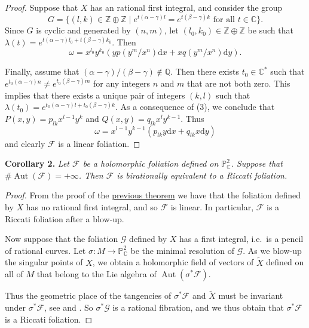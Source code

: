 \documentclass[british]{article}
\newenvironment{itenv}[1]
  {\phantomsection\par\smallskip\noindent\textbf{#1.}\itshape}
  {\par\smallskip}
\newcommand{\oldpage}[1]{\marginpar{\footnotesize$\Big\vert$ \textit{p.~#1}}}
\begin{document}
\begin{proof}
Suppose that \(X\) has an rational first integral, and consider the
group \[
  G
  = \{ (l,k)\in\mathbb{Z}\oplus\mathbb{Z}\mid e^{t(\alpha-\gamma)l}=e^{t(\beta-\gamma)k}\text{ for all }t\in\mathbb{C}\}.
\] Since \(G\) is cyclic and generated by \((n,m)\), let
\((l_0,k_0)\in\mathbb{Z}\oplus\mathbb{Z}\) be such that
\(\lambda(t)=e^{t(\alpha-\gamma)l_0+t(\beta-\gamma)k_0}\). Then \[
  \omega
  = x^{l_0}y^{k_0}(yp(y^m/x^n)\mathrm{d}{x} + xq(y^m/x^n)\mathrm{d}{y}).
\]

Finally, assume that
\((\alpha-\gamma)/(\beta-\gamma)\not\in\mathbb{Q}\). Then there exists
\(t_0\in\mathbb{C}^*\) such that
\(e^{t_0(\alpha-\gamma)n}\neq e^{t_0(\beta-\gamma)m}\) for any integers
\(n\) and \(m\) that are not both zero. This implies that there exists a
unique pair of integers \((k,l)\) such that
\(\lambda(t_0)=e^{t_0(\alpha-\gamma)l+t_0(\beta-\gamma)k}\). As a
consequence of (3), we conclude that \(P(x,y)=p_{lk}x^{l-1}y^k\) and
\(Q(x,y)=q_{lk}x^ly^{k-1}\). Thus \[
  \omega
  = x^{l-1}y^{k-1}(p_{lk}y\mathrm{d}{x} + q_{lk}x\mathrm{d}{y})
\] and clearly \({\mathcal{F}}\) is a linear foliation.
\end{proof}

\oldpage{55}

\protect{}\label{corollary-2}
\begin{itenv}{Corollary 2}
Let \({\mathcal{F}}\) be a holomorphic foliation defined on
\(\mathbb{P}_\mathbb{C}^2\). Suppose that
\(\#\operatorname{Aut}({\mathcal{F}})=+\infty\). Then \({\mathcal{F}}\)
is birationally equivalent to a Riccati foliation.

\end{itenv}

\begin{proof}
From the proof of the \hyperref[theorem-1]{previous theorem} we have
that the foliation defined by \(X\) has no rational first integral, and
so \({\mathcal{F}}\) is linear. In particular, \({\mathcal{F}}\) is a
Riccati foliation after a blow-up.

Now suppose that the foliation \({\mathcal{G}}\) defined by \(X\) has a
first integral, i.e.~is a pencil of rational curves. Let
\(\sigma\colon M\to\mathbb{P}_\mathbb{C}^2\) be the minimal resolution
of \({\mathcal{G}}\). As we blow-up the singular points of \(X\), we
obtain a holomorphic field of vectors of \(\widetilde{X}\) defined on
all of \(M\) that belong to the Lie algebra of
\(\operatorname{Aut}(\sigma^*{\mathcal{F}})\).

Thus the geometric place of the tangencies of \(\sigma^*{\mathcal{F}}\)
and \(\widetilde{X}\) must be invariant under \(\sigma^*{\mathcal{F}}\),
see \autocite{6} and \autocite{7}. So \(\sigma^*{\mathcal{G}}\) is a
rational fibration, and we thus obtain that \(\sigma^*{\mathcal{F}}\) is
a Riccati foliation.
\end{proof}
\end{document}
